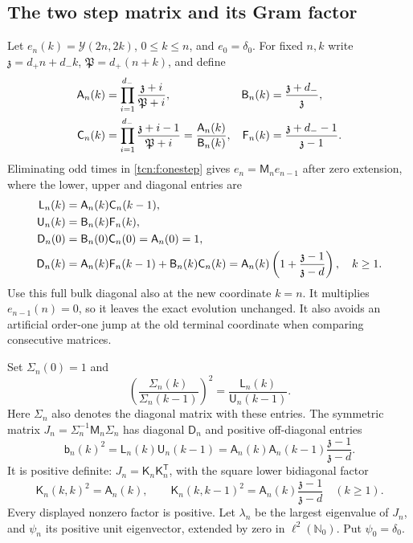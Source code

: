 \documentclass[11pt,letterpaper]{article}
\newcommand{\N}{\mathbb N}
\theoremstyle{remark}
\begin{document}
\subsection{The two step matrix and its Gram factor}
Let $e_n(k)=\mathcal Y(2n,2k)$, $0\le k\le n$, and $e_0=\delta_0$. For fixed $n,k$ write $\mathfrak z=d_+n+d_-k$, $\mathfrak P=d_+(n+k)$, and define
\begin{align}
 \mathsf A_n(k)&=\prod_{i=1}^{d_-}\frac{\mathfrak z+i}{\mathfrak P+i},&
 \mathsf B_n(k)&=\frac{\mathfrak z+d_-}{\mathfrak z},\notag\\
 \mathsf C_n(k)&=\prod_{i=1}^{d_-}\frac{\mathfrak z+i-1}{\mathfrak P+i}=\frac{\mathsf A_n(k)}{\mathsf B_n(k)},&
 \mathsf F_n(k)&=\frac{\mathfrak z+d_--1}{\mathfrak z-1}.\label{tcn:f:coefficients}
\end{align}
Eliminating odd times in \eqref{tcn:f:onestep} gives $e_n=\mathsf M_ne_{n-1}$ after zero extension, where the lower, upper and diagonal entries are
\begin{align}
 \mathsf L_n(k)&=\mathsf A_n(k)\mathsf C_n(k-1),\notag\\
 \mathsf U_n(k)&=\mathsf B_n(k)\mathsf F_n(k),\label{tcn:f:matrixentries}\\
 \mathsf D_n(0)&=\mathsf B_n(0)\mathsf C_n(0)=\mathsf A_n(0)=1,\notag\\
 \mathsf D_n(k)&=\mathsf A_n(k)\mathsf F_n(k-1)+\mathsf B_n(k)\mathsf C_n(k)
 =\mathsf A_n(k)\left(1+\frac{\mathfrak z-1}{\mathfrak z-d}\right),\quad k\ge1.\notag
\end{align}
Use this full bulk diagonal also at the new coordinate $k=n$. It multiplies $e_{n-1}(n)=0$, so it leaves the exact evolution unchanged. It also avoids an artificial order-one jump at the old terminal coordinate when comparing consecutive matrices.

Set $\Sigma_n(0)=1$ and
\[
 \left(\frac{\Sigma_n(k)}{\Sigma_n(k-1)}\right)^2=\frac{\mathsf L_n(k)}{\mathsf U_n(k-1)}.
\]
Here $\Sigma_n$ also denotes the diagonal matrix with these entries. The symmetric matrix $J_n=\Sigma_n^{-1}\mathsf M_n\Sigma_n$ has diagonal $\mathsf D_n$ and positive off-diagonal entries
\begin{equation}\label{tcn:f:beta}
 \mathsf b_n(k)^2=\mathsf L_n(k)\mathsf U_n(k-1)
 =\mathsf A_n(k)\mathsf A_n(k-1)\frac{\mathfrak z-1}{\mathfrak z-d}.
\end{equation}
It is positive definite: $J_n=\mathsf K_n\mathsf K_n^{\mathsf T}$, with the square lower bidiagonal factor
\begin{equation}\label{tcn:f:gram}
 \mathsf K_n(k,k)^2=\mathsf A_n(k),\qquad
 \mathsf K_n(k,k-1)^2=\mathsf A_n(k)\frac{\mathfrak z-1}{\mathfrak z-d}\quad(k\ge1).
\end{equation}
Every displayed nonzero factor is positive. Let $\lambda_n$ be the largest eigenvalue of $J_n$, and $\psi_n$ its positive unit eigenvector, extended by zero in $\ell^2(\N_0)$. Put $\psi_0=\delta_0$.
\end{document}

